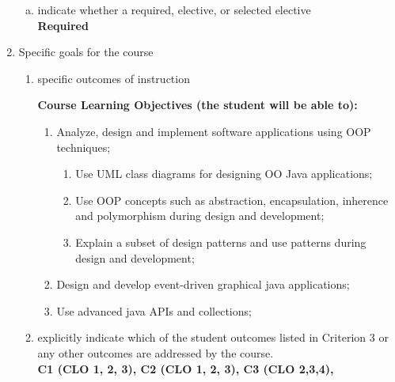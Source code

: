 \begin{enumerate}[1.]
\begin{enumerate}[a.]
\item indicate whether a required, elective, or selected elective\\ %
  {\bfseries
    Required
  }

\end{enumerate}

\item Specific goals for the course
\begin{enumerate}
\item specific outcomes of instruction\\ %
  {\bfseries
    Course Learning Objectives (the student will be able to):
\begin{enumerate}
\item Analyze, design and implement software applications using OOP techniques;
	\begin{enumerate}
	\item Use UML class diagrams for designing OO Java applications;
	\item Use OOP concepts such as abstraction, encapsulation, inherence and polymorphism during design and development;
	\item Explain a subset of design patterns and use patterns during design and development;
	\end{enumerate}
\item Design and develop event-driven graphical java applications;
\item Use advanced java APIs and collections;
\end{enumerate}
  }

\item explicitly indicate which of the student outcomes listed in Criterion 3 or any other outcomes are addressed by the course.\\
  {\bfseries
    C1 (CLO 1, 2, 3),
    C2 (CLO 1, 2, 3),
    C3 (CLO 2,3,4),
  }
\end{enumerate}


\end{enumerate}
